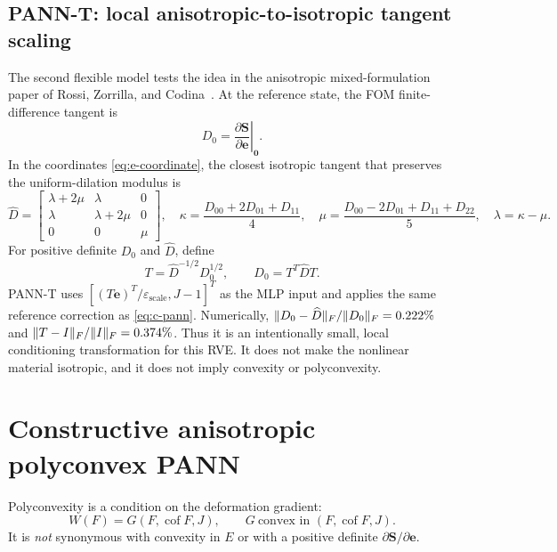 \documentclass[10pt,a4paper]{article}
\newcommand{\Cof}{\operatorname{cof}}
\begin{document}
\subsection{PANN-T: local anisotropic-to-isotropic tangent scaling}
\label{sec:metric}
The second flexible model tests the idea in the anisotropic mixed-formulation
paper of Rossi, Zorrilla, and Codina~\cite{Rossi2021}.  At the reference
state, the FOM finite-difference tangent is
\begin{equation}
 D_0=\left.\frac{\partial\bm S}{\partial\bm e}\right|_{\bm0}.
\end{equation}
In the coordinates \eqref{eq:e-coordinate}, the closest isotropic tangent
that preserves the uniform-dilation modulus is
\begin{equation}
 \widehat D=
 \begin{bmatrix}
 \lambda+2\mu&\lambda&0\\
 \lambda&\lambda+2\mu&0\\
 0&0&\mu
 \end{bmatrix},\quad
 \kappa=\frac{D_{00}+2D_{01}+D_{11}}{4},\quad
 \mu=\frac{D_{00}-2D_{01}+D_{11}+D_{22}}{5},\quad \lambda=\kappa-\mu.
 \label{eq:closest-isotropic}
\end{equation}
For positive definite $D_0$ and $\widehat D$, define
\begin{equation}
 T=\widehat D^{-1/2}D_0^{1/2},\qquad D_0=T^T\widehat D T.
 \label{eq:metric-map}
\end{equation}
PANN-T uses $[(T\bm e)^T/\varepsilon_\mathrm{scale},J-1]^T$ as the MLP
input and applies the same reference correction as \eqref{eq:c-pann}.
Numerically, $\|D_0-\widehat D\|_F/\|D_0\|_F=0.222\%$ and
$\|T-I\|_F/\|I\|_F=0.374\%$.  Thus it is an intentionally
small, local conditioning transformation for this RVE.  It does not make the
nonlinear material isotropic, and it does not imply convexity or
polyconvexity.

\section{Constructive anisotropic polyconvex PANN}
\label{sec:polyconvex}
Polyconvexity is a condition on the deformation gradient:
\begin{equation}
 W(F)=G(F,\Cof F,J),\qquad G\ \text{convex in }(F,\Cof F,J).
 \label{eq:poly-definition}
\end{equation}
It is \emph{not} synonymous with convexity in $E$ or with a positive definite
$\partial\bm S/\partial\bm e$.
\end{document}
